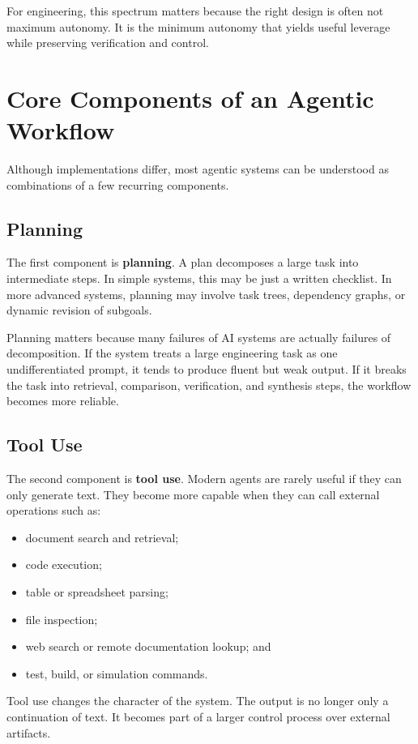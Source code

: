 \documentclass[12pt]{article}
\begin{document}
For engineering, this spectrum matters because the right design is often not maximum autonomy. It is the minimum autonomy that yields useful leverage while preserving verification and control.

\section{Core Components of an Agentic Workflow}

Although implementations differ, most agentic systems can be understood as combinations of a few recurring components.

\subsection{Planning}

The first component is \textbf{planning}. A plan decomposes a large task into intermediate steps. In simple systems, this may be just a written checklist. In more advanced systems, planning may involve task trees, dependency graphs, or dynamic revision of subgoals.

Planning matters because many failures of AI systems are actually failures of decomposition. If the system treats a large engineering task as one undifferentiated prompt, it tends to produce fluent but weak output. If it breaks the task into retrieval, comparison, verification, and synthesis steps, the workflow becomes more reliable.

\subsection{Tool Use}

The second component is \textbf{tool use}. Modern agents are rarely useful if they can only generate text. They become more capable when they can call external operations such as:
\begin{itemize}
    \item document search and retrieval;
    \item code execution;
    \item table or spreadsheet parsing;
    \item file inspection;
    \item web search or remote documentation lookup; and
    \item test, build, or simulation commands.
\end{itemize}

Tool use changes the character of the system. The output is no longer only a continuation of text. It becomes part of a larger control process over external artifacts.
\end{document}
